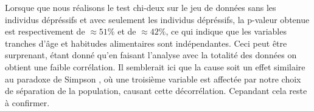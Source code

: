 Lorsque que nous réalisons le test chi-deux sur le jeu de données sans les individus dépréssifs et avec seulement les individus dépréssifs, la p-valeur obtenue est respectivement de $\approx 51\%$ et de $\approx 42\%$, ce qui indique que les variables tranches d'âge et habitudes alimentaires sont indépendantes. 
Ceci peut être surprenant, étant donné qu'en faisant l'analyse avec la totalité des données on obtient une faible corrélation. Il semblerait ici que la cause soit un effet similaire au paradoxe de Simpson \citep{simpson}, où une troisième variable est affectée par notre choix de séparation de la population, causant cette décorrélation. Cepandant cela reste à confirmer.

